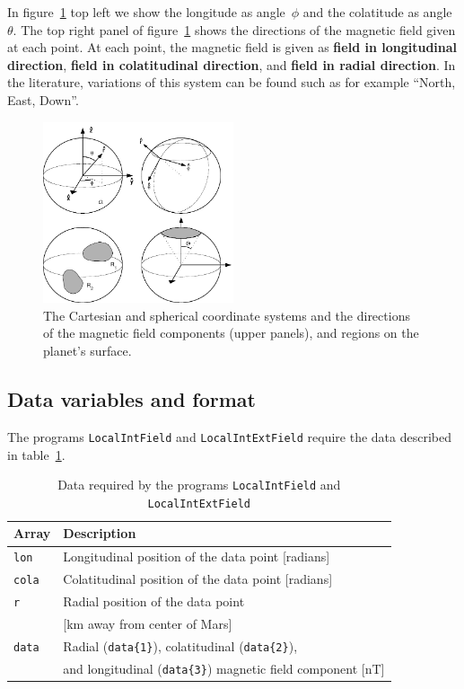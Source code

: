 \documentclass[11pt]{article}
\begin{document}
In figure~\ref{coordsys} top left we show the
longitude as angle~$\phi$ and the colatitude as angle~$\theta$. The
top right panel of figure~\ref{coordsys} shows the directions of the
magnetic field given at each point. At each point, the magnetic field
is given as \textbf{field in longitudinal direction}, \textbf{field in
colatitudinal direction}, and \textbf{field in radial direction}. In
the literature, variations of this system can be found such as for example
``North, East, Down''. 

\begin{figure}
  \centering
  \includegraphics[width=0.5\textwidth]{figures/psdiagram.pdf}
  \caption{\label{coordsys} The Cartesian and spherical
    coordinate systems and the directions of the magnetic field
    components (upper panels), and regions on the planet's surface.}
\end{figure}


\subsection{Data variables and format}
The programs \verb+LocalIntField+ and \verb+LocalIntExtField+ require
the data described in table~\ref{datatable}.

\begin{table}
  \caption{\label{datatable} Data required by the programs
    \texttt{LocalIntField} and \texttt{LocalIntExtField} }
  \centering
  \begin{tabular}{l|l}
    Array&Description\\
    \hline
    \verb+lon+&Longitudinal position of the data point [radians]\\
    \verb+cola+&Colatitudinal position of the data point [radians]\\
    \verb+r+&Radial position of the data point \\
    &[km away from center of Mars]\\
    \verb+data+& Radial (\verb+data{1}+), colatitudinal (\verb+data{2}+),\\
    &and longitudinal (\verb+data{3}+) magnetic field component [nT]\\
  \end{tabular}
\end{table}
\end{document}
